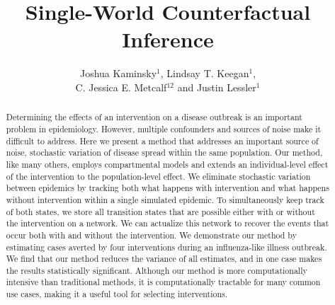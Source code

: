 \documentclass[PTRSB]{rsos}
\title{Single-World Counterfactual Inference}
\author{%
Joshua Kaminsky$^{1}$, Lindsay T. Keegan$^{1}$,\\C. Jessica E. Metcalf$^{12}$ and Justin Lessler$^{1}$}
\begin{document}
\begin{abstract} %
  Determining the effects of an intervention on a disease outbreak is an important problem in epidemiology. %
  However, multiple confounders and sources of noise make it difficult to address. %
  Here we present a method that addresses an important source of noise, stochastic variation of disease spread within the same population. %
  Our method, like many others, employs compartmental models and extends an individual-level effect of the intervention to the population-level effect. %
  We eliminate stochastic variation between epidemics by tracking both what happens with intervention and what happens without intervention within a single simulated epidemic. %
  To simultaneously keep track of both states, we store all transition states that are possible either with or without the intervention on a network. %
  We can actualize this network to recover the events that occur both with and without the intervention. %
  We demonstrate our method by estimating cases averted by four interventions during an influenza-like illness outbreak. %
  We find that our method reduces the variance of all estimates, and in one case makes the results statistically significant. %
  Although our method is more computationally intensive than traditional methods, it is computationally tractable for many common use cases, making it a useful tool for selecting interventions. %
\end{abstract}



\maketitle
\end{document}
